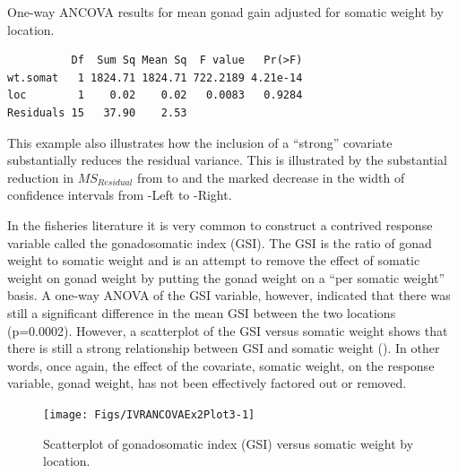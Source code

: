 \documentclass[10pt,openany]{book}\usepackage[]{graphicx}\usepackage[]{color}
\makeatletter
\newenvironment{kframe}{%
 \def\at@end@of@kframe{}%
 \ifinner\ifhmode%
  \def\at@end@of@kframe{\end{minipage}}%
  \begin{minipage}{\columnwidth}%
 \fi\fi%
 \def\FrameCommand##1{\hskip\@totalleftmargin \hskip-\fboxsep
 \colorbox{shadecolor}{##1}\hskip-\fboxsep
     \hskip-\linewidth \hskip-\@totalleftmargin \hskip\columnwidth}%
 \MakeFramed {\advance\hsize-\width
   \@totalleftmargin\z@ \linewidth\hsize
   \@setminipage}}%
 {\par\unskip\endMakeFramed%
 \at@end@of@kframe}
\newenvironment{knitrout}{}{} %
\makeatother
\begin{document}
\begin{table}[h]
  \centering
  \caption{One-way ANCOVA results for mean gonad gain adjusted for somatic weight by location.}\label{tab:IVRANCOVAEx2Res2}
\begin{knitrout}
\color{fgcolor}\begin{kframe}
\begin{verbatim}
          Df  Sum Sq Mean Sq  F value   Pr(>F)
wt.somat   1 1824.71 1824.71 722.2189 4.21e-14
loc        1    0.02    0.02   0.0083   0.9284
Residuals 15   37.90    2.53                  
\end{verbatim}
\end{kframe}
\end{knitrout}
\end{table}


This example also illustrates how the inclusion of a ``strong'' covariate substantially reduces the residual variance.  This is illustrated by the substantial reduction in $MS_{Residual}$ from  to  and the marked decrease in the width of confidence intervals from -Left to -Right.

In the fisheries literature it is very common to construct a contrived response variable called the gonadosomatic index (GSI).  The GSI is the ratio of gonad weight to somatic weight and is an attempt to remove the effect of somatic weight on gonad weight by putting the gonad weight on a ``per somatic weight'' basis.  A one-way ANOVA of the GSI variable, however, indicated that there was still a significant difference in the mean GSI between the two locations (p=0.0002).  However, a scatterplot of the GSI versus somatic weight shows that there is still a strong relationship between GSI and somatic weight ().  In other words, once again, the effect of the covariate, somatic weight, on the response variable, gonad weight, has not been effectively factored out or removed.

\begin{knitrout}
\color{fgcolor}\begin{figure}[h]

{\centering \texttt{[image: Figs/IVRANCOVAEx2Plot3-1]} 

}

\caption[Scatterplot of gonadosomatic index (GSI) versus somatic weight by location]{Scatterplot of gonadosomatic index (GSI) versus somatic weight by location.}\label{fig:IVRANCOVAEx2Plot3}
\end{figure}


\end{knitrout}
\end{document}
